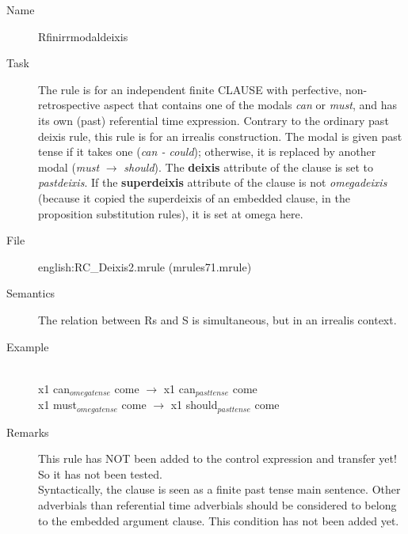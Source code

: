 \begin{description}
\vspace{1 cm}
\begin{description}
\item[Name]   Rfinirrmodaldeixis
\item[Task] The rule is for an independent finite CLAUSE with perfective, 
non-retrospective aspect that contains one of 
the modals {\em can\/} or {\em must\/}, and has its own (past)
referential time expression. Contrary to the ordinary past deixis rule, this 
rule is for an irrealis construction. The 
modal is given past tense if it takes one ({\em can - could\/}); otherwise, it 
is replaced by another modal ({\em must\/} $\rightarrow$ {\em should\/}).
The {\bf deixis} attribute of the clause is set to {\em pastdeixis\/}. If the {
\bf superdeixis} attribute of the clause is not {\em omegadeixis\/} (because 
it copied the superdeixis of an embedded clause, in the proposition 
substitution rules), it is set at omega here.
\item[File] english:RC\_Deixis2.mrule (mrules71.mrule)
\item[Semantics] The relation between Rs and S is simultaneous, but in an 
irrealis context.
\item[Example] \mbox{}\\
x1 can$_{omegatense}$ come $\rightarrow$ x1 can$_{pasttense}$ come\\
x1 must$_{omegatense}$ come $\rightarrow$ x1 should$_{pasttense}$ come
\item[Remarks] This rule has NOT been added to the control expression and 
transfer yet! So it has not been tested.\\
Syntactically, the clause is seen as a finite past tense main sentence. Other 
adverbials than referential time adverbials should be considered to belong 
to the embedded argument clause. This condition has not been added yet. 
\end{description}

\newpage

\end{description}
